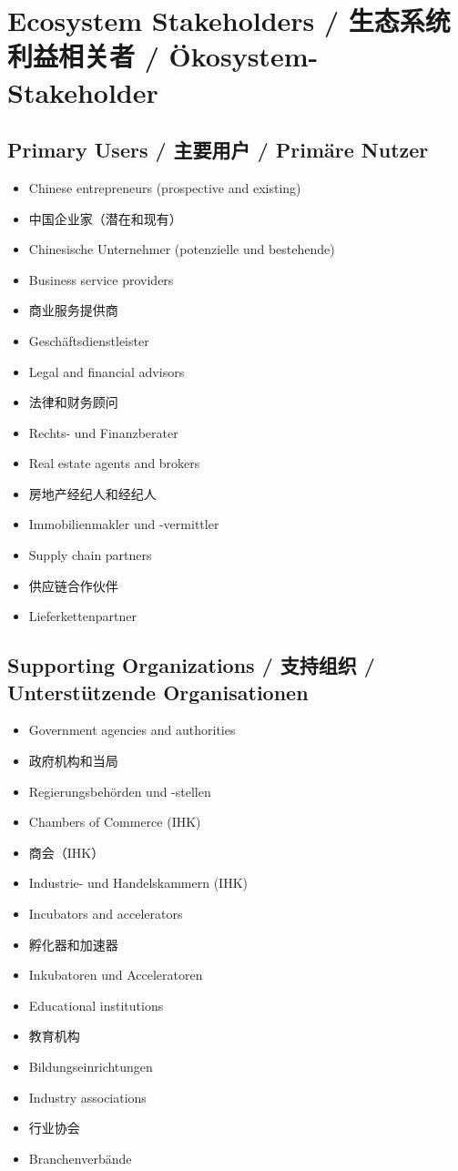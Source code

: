 \section{Ecosystem Stakeholders / 生态系统利益相关者 / Ökosystem-Stakeholder}

\subsection{Primary Users / 主要用户 / Primäre Nutzer}
\begin{itemize}
    \item Chinese entrepreneurs (prospective and existing)
    \item 中国企业家（潜在和现有）
    \item Chinesische Unternehmer (potenzielle und bestehende)
    \item Business service providers
    \item 商业服务提供商
    \item Geschäftsdienstleister
    \item Legal and financial advisors
    \item 法律和财务顾问
    \item Rechts- und Finanzberater
    \item Real estate agents and brokers
    \item 房地产经纪人和经纪人
    \item Immobilienmakler und -vermittler
    \item Supply chain partners
    \item 供应链合作伙伴
    \item Lieferkettenpartner
\end{itemize}

\subsection{Supporting Organizations / 支持组织 / Unterstützende Organisationen}
\begin{itemize}
    \item Government agencies and authorities
    \item 政府机构和当局
    \item Regierungsbehörden und -stellen
    \item Chambers of Commerce (IHK)
    \item 商会（IHK）
    \item Industrie- und Handelskammern (IHK)
    \item Incubators and accelerators
    \item 孵化器和加速器
    \item Inkubatoren und Acceleratoren
    \item Educational institutions
    \item 教育机构
    \item Bildungseinrichtungen
    \item Industry associations
    \item 行业协会
    \item Branchenverbände
\end{itemize}

